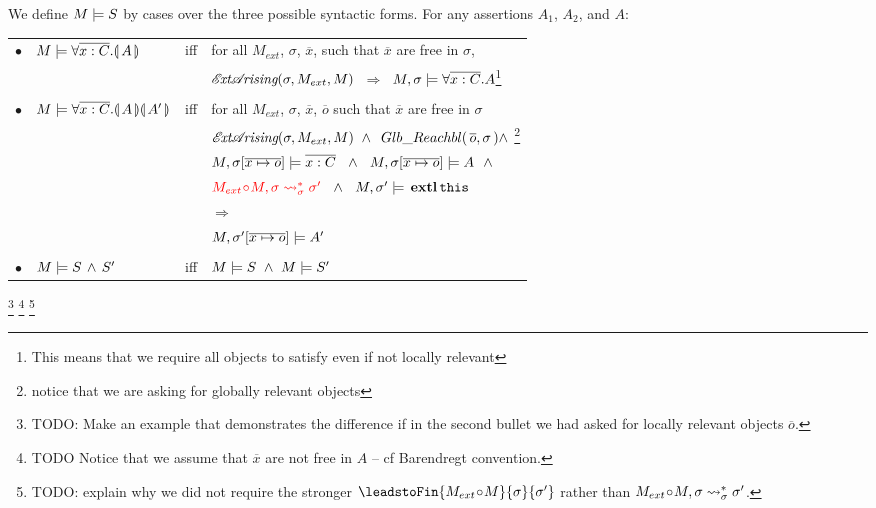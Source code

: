 \begin{definition}%

We define $M \models {S}$ by cases over the three possible syntactic forms.
For any assertions   $A_1$, $A_2$, and $A$: \\

\label{def:necessity-semantics}

\begin{tabular}{l l c l }

$\bullet$ & $M \models \forall {\overline {x:C}}.{\llparenthesis}\, A \,{\rrparenthesis} 	$& iff & 
for all $M_{ext}$, $\sigma$, $\overline{x}$, such that $\overline{x}$  are free in $\sigma$, \\
  & & & $ {\mathcal{E}\!\textit{xt}\mathcal{A}\!\textit{rising}(\sigma, M_{ext}, M)}$ %
$ \ \Longrightarrow \  $  %
{$ M , \sigma \models \forall \overline{x:C}.A$}\footnote{{This means that we require all objects to satisfy even if not locally relevant}}
\\
\\
$\bullet$ & $M \models \forall {\overline {x:C}}.{\llparenthesis}\, A \,{\rrparenthesis}{\llparenthesis}\, A' \,{\rrparenthesis}$& iff & 
for all $M_{ext}$, $\sigma$, $\overline{x}$, $\overline{o}$ such that $\overline{x}$  are free in $\sigma$  \\
& & &
${\extArising{\sigma}{M_{ext}}{M}} \ \wedge\  \GRelevant {\overline o}  \sigma \wedge \ $\footnote{{notice that we are asking for globally relevant objects}}\\
& & & $ \satisfiesA{M}{\sigma[\overline{x\mapsto o}]}{\overline {x:C}}  \ \ \wedge\ \  \satisfiesA{M}{\sigma[\overline{x\mapsto o}]}{A} \ \ \wedge$ \\ 
& & &
$\color{red}M_{ext}\!\circ \!M, \sigma \leadsto^*_{\sigma} \sigma'  \color{black} \ \ \wedge\ \  M, \sigma' \models {{\ensuremath{\, \mathbf{extl}}\, {\texttt{this}}\, }}$ \\
& & & $ \Longrightarrow $ \\
& & & $ M , \sigma'[\overline{x\mapsto o}] \models A' $
\\
\\
$\bullet$ &  $M \models S\, \wedge\, S'$ &   iff   & $\satisfies{M}{S}\ \wedge \ \satisfies{M}{S'}$
\end{tabular} 

 
\end{definition} 


  
\footnote{{TODO: Make an example that demonstrates the difference if in the second bullet we had asked for locally relevant objects ${\overline o}$.}}
\footnote{{TODO Notice that we assume that $\overline x$ are not free in $A$ -- cf Barendregt convention.}}
\footnote{TODO: explain why we did not require the stronger $\leadstoFin{M_{ext}\!\circ \!M}{\sigma}{\sigma'}$ rather than $M_{ext}\!\circ \!M, \sigma \leadsto^*_{\sigma} \sigma'$.}



